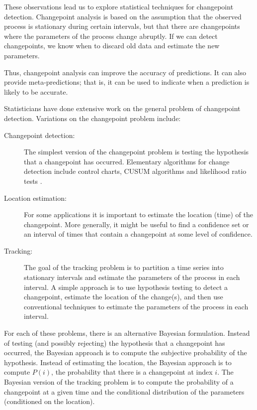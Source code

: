 \documentclass[twocolumn,11pt]{article}
\begin{document}
These observations lead us to explore statistical techniques for
changepoint detection.  Changepoint analysis is based on the
assumption that the observed process is stationary during certain
intervals, but that there are changepoints where the parameters of the
process change abruptly.  If we can detect changepoints, we know
when to discard old data and estimate the new parameters.

Thus, changepoint analysis can improve the accuracy of predictions.
It can also provide meta-predictions; that is, it can be used to
indicate when a prediction is likely to be accurate.

Statisticians have done extensive work on the general problem of
changepoint detection.  Variations on the changepoint problem
\cite{bhattacharya94some} include:

\begin{description}

\item[Changepoint detection:] The simplest version of the changepoint
problem is testing the hypothesis that a changepoint has
occurred.  Elementary algorithms for change detection include control
charts, CUSUM algorithms and likelihood ratio tests
\cite{basseville93detection}.

\item[Location estimation:] For some applications it is important
to estimate the location (time) of the changepoint.  More generally, it
might be useful to find a confidence set or an interval of times
that contain a changepoint at some level of confidence.

\item[Tracking:] The goal of the tracking problem is to partition a
time series into stationary intervals and estimate the parameters of
the process in each interval.  A simple approach is to use hypothesis
testing to detect a changepoint, estimate the location of the change(s),
and then use conventional techniques to estimate the parameters of the
process in each interval.

\end{description}

For each of these problems, there is an alternative Bayesian
formulation.  Instead of testing (and possibly rejecting) the
hypothesis that a changepoint has occurred, the Bayesian approach is
to compute the subjective probability of the hypothesis.  Instead of
estimating the location, the Bayesian approach is to compute $P(i)$,
the probability that there is a changepoint at index $i$.  The
Bayesian version of the tracking problem is to compute the probability
of a changepoint at a given time and the conditional distribution of
the parameters (conditioned on the location).
\end{document}

